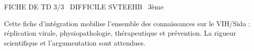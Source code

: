\documentclass[11pt]{article}
\begin{document}
\begin{tcolorbox}[enhanced,colback=popink,colframe=popink,arc=10pt,boxrule=0pt,left=12pt,right=12pt,top=9pt,bottom=9pt]
{\color{white}\popxbold\small FICHE DE TD 3/3 \textbullet\ DIFFICILE \hfill SVTEEHB \textbullet\ 3ème\par}
\end{tcolorbox}
\vspace{4pt}
\noindent Cette fiche d'intégration mobilise l'ensemble des connaissances sur le VIH/Sida : réplication virale, physiopathologie, thérapeutique et prévention. La rigueur scientifique et l'argumentation sont attendues.
\end{document}
